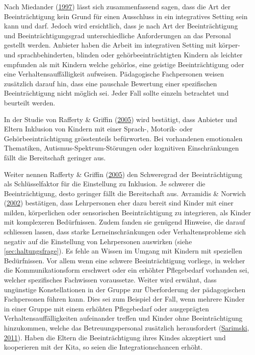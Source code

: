 \documentclass[
  ngerman,
  11pt,
  paper=a4,
  twoside,
  titlepage=true,
  openright,
  abstract=on,
  toc=listofnumbered,
  numbers=noenddot,
  chapterprefix=true,
  headings=optiontohead,
  svgnames,
  dvipsnames]{scrreprt}
\begin{document}
Nach Miedander (\protect\hyperlink{ref-miedander}{1997}) lässt sich
zusammenfassend sagen, dass die Art der Beeinträchtigung kein Grund für
einen Ausschluss in ein integratives Setting sein kann und darf. Jedoch
wird ersichtlich, dass je nach Art der Beeinträchtigung und
Beeinträchtigungsgrad unterschiedliche Anforderungen an das Personal
gestellt werden. Anbieter haben die Arbeit im integrativen Setting mit
körper- und sprachbehinderten, blinden oder gehörbeeinträchtigten
Kindern als leichter empfunden als mit Kindern welche gehörlos, eine
geistige Beeinträchtigung oder eine Verhaltensauffälligkeit aufweisen.
Pädagogische Fachpersonen weisen zusätzlich darauf hin, dass eine
pauschale Bewertung einer spezifischen Beeinträchtigung nicht möglich
sei. Jeder Fall sollte einzeln betrachtet und beurteilt werden.

In der Studie von Rafferty \& Griffin
(\protect\hyperlink{ref-raffertyux5cux26Griffin2005}{2005}) wird
bestätigt, dass Anbieter und Eltern Inklusion von Kindern mit einer
Sprach-, Motorik- oder Gehörbeeinträchtigung grösstenteils befürworten.
Bei vorhandenen emotionalen Thematiken, Autismus-Spektrum-Störungen oder
kognitiven Einschränkungen fällt die Bereitschaft geringer aus.

Weiter nennen Rafferty \& Griffin
(\protect\hyperlink{ref-raffertyux5cux26Griffin2005}{2005}) den
Schweregrad der Beeinträchtigung als Schlüsselfaktor für die Einstellung
zu Inklusion. Je schwerer die Beeinträchtigung, desto geringer fällt die
Bereitschaft aus. Avramidis \& Norwich
(\protect\hyperlink{ref-europeanjournal}{2002}) bestätigen, dass
Lehrpersonen eher dazu bereit sind Kinder mit einer milden, körperlichen
oder sensorischen Beeinträchtigung zu integrieren, als Kinder mit
komplexeren Bedürfnissen. Zudem fanden sie genügend Hinweise, die darauf
schliessen lassen, dass starke Lerneinschränkungen oder
Verhaltensprobleme sich negativ auf die Einstellung von Lehrpersonen
auswirken (siehe \cref{sec:haltungsfrage}). Es fehle an Wissen im Umgang
mit Kindern mit speziellen Bedürfnissen. Vor allem wenn eine schwere
Beeinträchtigung vorliege, in welcher die Kommunikationsform erschwert
oder ein erhöhter Pflegebedarf vorhanden sei, welcher spezifisches
Fachwissen voraussetze. Weiter wird erwähnt, dass ungünstige
Konstellationen in der Gruppe zur Überforderung der pädagogischen
Fachpersonen führen kann. Dies sei zum Beispiel der Fall, wenn mehrere
Kinder in einer Gruppe mit einem erhöhten Pflegebedarf oder ausgeprägten
Verhaltensauffälligkeiten aufeinander treffen und Kinder ohne
Beeinträchtigung hinzukommen, welche das Betreuungspersonal zusätzlich
herausfordert
(\protect\hyperlink{ref-sarimskiBehinderteKinder2011}{Sarimski, 2011}).
Haben die Eltern die Beeinträchtigung ihres Kindes akzeptiert und
kooperieren mit der Kita, so seien die Integrationschancen erhöht.
\end{document}
